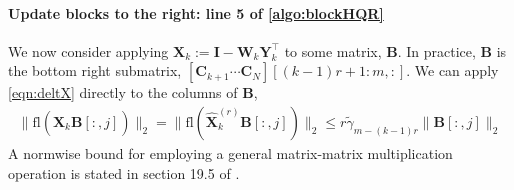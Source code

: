 \documentclass[review,onefignum,onetabnum]{siamart190516}
\newcommand{\dd}{\delta}
\newcommand{\bb}[1]{\mathbf{#1}}
\newcommand{\fl}{\mathrm{fl}}
\begin{document}
\paragraph{Update blocks to the right: line 5 of \cref{algo:blockHQR}}
We now consider applying $\bb{X}_{k}:=\bb{I}-\bb{W}_k\bb{Y}_k^{\top}$ to some matrix, $\bb{B}$.
In practice, $\bb{B}$ is the bottom right submatrix, $[\bb{C}_{k+1}\cdots \bb{C}_{N}][(k-1)r+1:m,:]$.
We can apply \cref{eqn:deltX} directly to the columns of $\bb{B}$, 
\begin{align}
\|\fl(\hat{\bb{X}}_k \bb{B}[:,j])\|_2 = \|\fl(\hat{\bb{X}}_k^{(r)} \bb{B}[:,j])\|_2 \leq r\tilde{\gamma}_{m-(k-1)r} \|\bb{B}[:,j]\|_2
\end{align}
A normwise bound for employing a general matrix-matrix multiplication operation is stated in section 19.5 of \cite{Higham2002}.
\end{document}
